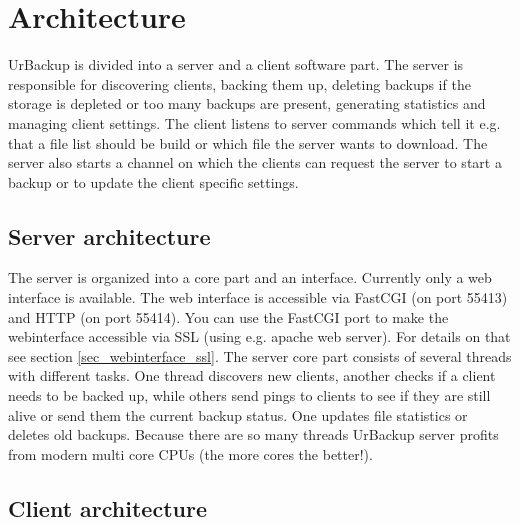 \documentclass[a4paper,10pt]{article}
\begin{document}
\section{Architecture}
\label{sec_architecture}

UrBackup is divided into a server and a client software part.
The server is responsible for discovering clients, backing them up, deleting
backups if the storage is depleted or too many backups are present, generating
statistics and managing client settings. The client
listens to server commands which tell it e.g. that a file list should be build
or which file the server wants to download. The server also starts a channel on
which the clients can request the server to start a backup or to update the
client specific settings.

\subsection{Server architecture}

The server is organized into a core part and an interface. Currently only a
web interface is available. The web interface is accessible via FastCGI (on port
55413) and HTTP (on port 55414). You can use the FastCGI port to make the
webinterface accessible via SSL (using e.g. apache web server). For details on
that see section \ref{sec_webinterface_ssl}. The server core part consists of
several threads with different tasks. One thread discovers new clients, another
checks if a client needs to be backed up, while others send pings to clients to
see if they are still alive or send them the current backup status. One updates
file statistics or deletes old backups. Because there are so many threads
UrBackup server profits from modern multi core CPUs (the more cores the
better!).

\subsection{Client architecture}
\end{document}
